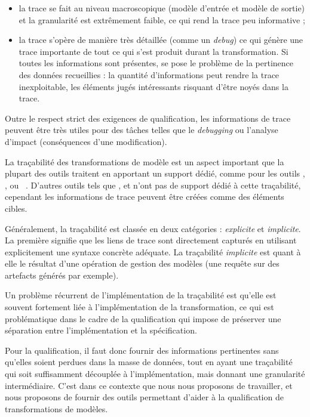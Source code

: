 \begin{itemize}

  \item la trace se fait au niveau macroscopique (modèle d'entrée et modèle de
    sortie) et la granularité est extrêmement faible, ce qui rend la trace peu
    informative ;

  \item la trace s'opère de manière très détaillée (comme un \emph{debug}) ce
    qui génère une trace importante de tout ce qui s'est produit durant la
    transformation. Si toutes les informations sont présentes, se pose le
    problème de la pertinence des données recueillies : la quantité
    d'informations peut rendre la trace inexploitable, les éléments
    jugés intéressants risquant d'être noyés dans la trace.

\end{itemize}

Outre le respect strict des exigences de qualification, les informations de
trace peuvent être très utiles pour des tâches telles que le \emph{debugging}
ou l'analyse d'impact (conséquences d'une modification).

La traçabilité des transformations de modèle est un aspect important que la
plupart des outils traitent en apportant un support dédié, comme pour les
outils {\qvt}, {\atl}, {\tefkat} ou {\kermeta}~\cite{Falleri2006}.
D'autres outils tels que {\agg}, {\viatra} et {\great} n'ont pas de support
dédié à cette traçabilité, cependant les informations de trace peuvent être
créées comme des éléments cibles.

Généralement, la traçabilité est classée en deux catégories : \emph{explicite}
et \emph{implicite}. La première signifie que les liens de trace sont
directement capturés en utilisant explicitement une syntaxe concrète adéquate.
La traçabilité \emph{implicite} est quant à elle le résultat d'une opération de
gestion des modèles (une requête sur des artefacts générés par exemple).

Un problème récurrent de l'implémentation de la traçabilité est qu'elle est
souvent fortement liée à l'implémentation de la transformation, ce qui est
problématique dans le cadre de la qualification qui impose de préserver une
séparation entre l'implémentation et la spécification. 


Pour la qualification, il faut donc fournir des informations pertinentes sans
qu'elles soient perdues dans la masse de données, tout en ayant une traçabilité
qui soit suffisamment découplée à l'implémentation, mais donnant une granularité
intermédiaire. C'est dans ce contexte que nous nous proposons de travailler, et
nous proposons de fournir des outils permettant d'aider à la qualification de
transformations de modèles.



